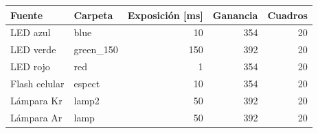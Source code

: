 \begin{tabular}{llrrr}
\toprule
Fuente & Carpeta & Exposición [ms] & Ganancia & Cuadros \\
\midrule
LED azul & blue & 10 & 354 & 20 \\
LED verde & green\_150 & 150 & 392 & 20 \\
LED rojo & red & 1 & 354 & 20 \\
Flash celular & espect & 10 & 354 & 20 \\
Lámpara Kr & lamp2 & 50 & 392 & 20 \\
Lámpara Ar & lamp & 50 & 392 & 20 \\
\bottomrule
\end{tabular}
